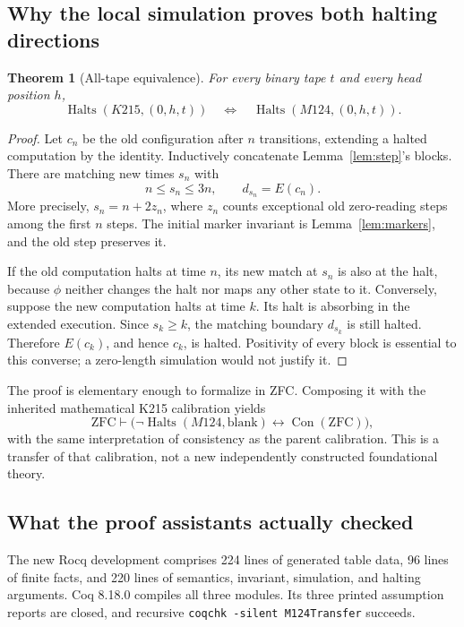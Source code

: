 \documentclass[11pt]{article}
\newtheorem{theorem}{Theorem}[section]
\theoremstyle{remark}\newtheorem{remark}[theorem]{Remark}
\newcommand{\Halts}{\operatorname{Halts}}
\newcommand{\Con}{\operatorname{Con}}
\newcommand{\code}[1]{\texttt{\small #1}}
\begin{document}
\subsection{Why the local simulation proves both halting directions}

\begin{theorem}[All-tape equivalence]\label{thm:alltape}
For every binary tape $t$ and every head position $h$,
\[
 \Halts(K215,(0,h,t))\quad\Longleftrightarrow\quad
 \Halts(M124,(0,h,t)).
\]
\end{theorem}
\begin{proof}
Let $c_n$ be the old configuration after $n$ transitions, extending a halted computation by the identity. Inductively concatenate Lemma~\ref{lem:step}'s blocks. There are matching new times $s_n$ with
\[
 n\le s_n\le 3n,\qquad d_{s_n}=E(c_n).
\]
More precisely, $s_n=n+2z_n$, where $z_n$ counts exceptional old zero-reading steps among the first $n$ steps. The initial marker invariant is Lemma~\ref{lem:markers}, and the old step preserves it.

If the old computation halts at time $n$, its new match at $s_n$ is also at the halt, because $\phi$ neither changes the halt nor maps any other state to it. Conversely, suppose the new computation halts at time $k$. Its halt is absorbing in the extended execution. Since $s_k\ge k$, the matching boundary $d_{s_k}$ is still halted. Therefore $E(c_k)$, and hence $c_k$, is halted. Positivity of every block is essential to this converse; a zero-length simulation would not justify it.
\end{proof}

The proof is elementary enough to formalize in ZFC. Composing it with the inherited mathematical K215 calibration yields
\[
 \mathrm{ZFC}\vdash
 \bigl(\neg\Halts(M124,\mathrm{blank})\leftrightarrow\Con(\mathrm{ZFC})\bigr),
\]
with the same interpretation of consistency as the parent calibration. This is a transfer of that calibration, not a new independently constructed foundational theory.

\subsection{What the proof assistants actually checked}

The new Rocq development comprises 224 lines of generated table data, 96 lines of finite facts, and 220 lines of semantics, invariant, simulation, and halting arguments. Coq 8.18.0 compiles all three modules. Its three printed assumption reports are closed, and recursive \code{coqchk -silent M124Transfer} succeeds.
\end{document}
